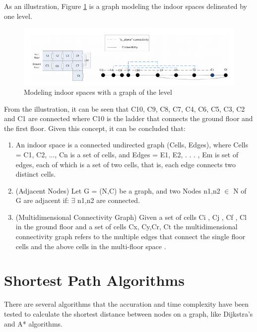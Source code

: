 As an illustration, Figure \ref{fig:figure5} is a graph modeling the indoor spaces delineated by one level.

\begin{figure}[h!]
	\centering
	\includegraphics[scale=0.6]{figure5a.png}
	\caption{Modeling indoor spaces with a graph of the level \cite{alamri2014adjacency}}
	\label{fig:figure5}
\end{figure}

From the illustration, it can be seen that C10, C9, C8, C7, C4, C6, C5, C3, C2 and C1 are connected where C10 is the ladder that connects the ground floor and the first floor. Given this concept, it can be concluded that:
\begin{enumerate}
	\item An indoor space is a connected undirected graph (Cells, Edges), where Cells = {C1, C2, ..., Cn} is a set of cells, and Edges = {E1, E2, . . . , Em} is set of edges, each of which is a set of two cells, that is, each edge connects two distinct cells. 
	\item (Adjacent Nodes) Let G = (N,C) be a graph, and two Nodes n1,n2 $\in$ N of G are adjacent if: $\exists$ n1,n2 are connected.
	\item (Multidimensional Connectivity Graph) Given a set of cells Ci , Cj , Cf , Cl in the ground floor and a set of cells Cx, Cy,Cr, Ct the multidimensional connectivity graph refers to the multiple edges that connect the single floor cells and the above cells in the multi-floor space \cite{alamri2014adjacency}.
\end{enumerate}	 

\section{Shortest Path Algorithms}
There are several algorithms that the accuration and time complexity have been tested to calculate the shortest distance between nodes on a graph, like Dijkstra's and A* algorithms.
